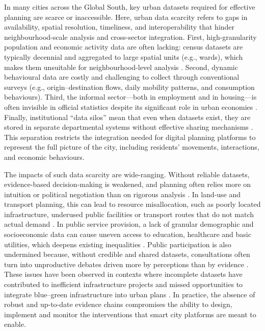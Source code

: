 \documentclass[
  12pt,
  oneside]{book}
\begin{document}
In many cities across the Global South, key urban datasets required for effective planning are scarce or inaccessible. Here, urban data scarcity refers to gaps in availability, spatial resolution, timeliness, and interoperability that hinder neighbourhood-scale analysis and cross-sector integration. First, high-granularity population and economic activity data are often lacking: census datasets are typically decennial and aggregated to large spatial units (e.g., wards), which makes them unsuitable for neighbourhood-level analysis \autocite{georganosCensusHeavenUnraveling2022,satterthwaite5UrbanMyths2010}. Second, dynamic behavioural data are costly and challenging to collect through conventional surveys (e.g., origin--destination flows, daily mobility patterns, and consumption behaviours). Third, the informal sector---both in employment and in housing---is often invisible in official statistics despite its significant role in urban economies \autocite{brahmbhattUrbanSlumsDatafying2019}. Finally, institutional ``data silos'' mean that even when datasets exist, they are stored in separate departmental systems without effective sharing mechanisms \autocite{gosling-goldsmithAerialterrestrialDataFusion2025}. This separation restricts the integration needed for digital planning platforms to represent the full picture of the city, including residents' movements, interactions, and economic behaviours.

The impacts of such data scarcity are wide-ranging. Without reliable datasets, evidence-based decision-making is weakened, and planning often relies more on intuition or political negotiation than on rigorous analysis \autocite{duhrSpatialDataRequirements2021}. In land-use and transport planning, this can lead to resource misallocation, such as poorly located infrastructure, underused public facilities or transport routes that do not match actual demand \autocite{shehuChallengesApplyingBig2024}. In public service provision, a lack of granular demographic and socioeconomic data can cause uneven access to education, healthcare and basic utilities, which deepens existing inequalities \autocite{srivastavaSegregatedDataUrban2017}. Public participation is also undermined because, without credible and shared datasets, consultations often turn into unproductive debates driven more by perceptions than by evidence \autocite{delphinObstaclesDevelopmentIntegrated2022}. These issues have been observed in contexts where incomplete datasets have contributed to inefficient infrastructure projects and missed opportunities to integrate blue--green infrastructure into urban plans \autocite{adeloyeKeyChallengesEvidencebased2015,sorensenDataManagementFramework2021}. In practice, the absence of robust and up-to-date evidence chains compromises the ability to design, implement and monitor the interventions that smart city platforms are meant to enable.
\end{document}

